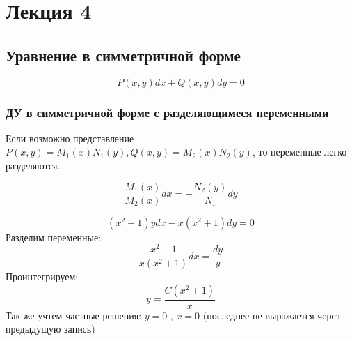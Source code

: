 \section{\Large{Лекция 4}}
\subsection{Уравнение в симметричной форме}

\begin{Def} 
\begin{equation}
    P(x , y) dx + Q(x, y) dy = 0
\end{equation}
\end{Def}

\subsubsection{ДУ в симметричной форме с разделяющимеся переменными}

Если возможно представление $P(x, y) = M_1(x) N_1(y), Q(x, y) = M_2(x) N_2(y) $, то переменные легко разделяются.

\begin{equation}
    \frac{M_1(x)}{M_2(x)} dx =  - \frac{N_2(y)}{N_1} dy
\end{equation}

\begin{example}
\begin{equation}
    (x^2 - 1)y dx  - x(x^2+1)dy = 0
\end{equation}
Разделим переменные:
\begin{equation}
    \frac{x^2 - 1}{x(x^2+1)} dx = \frac{dy}{y}
\end{equation}
Проинтегрируем:
\begin{equation}
    y = \frac{C(x^2+1)}{x}
\end{equation}
Так же учтем частные решения: $y = 0$ , $x = 0$ (последнее не выражается через предыдущую запись)
\end{example}

